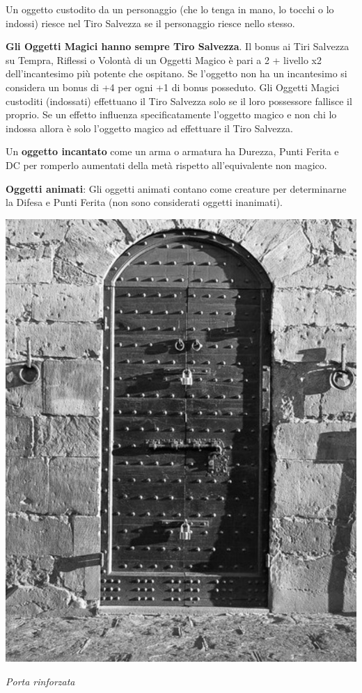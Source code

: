 \begin{multicols}{2}
Un oggetto custodito da un personaggio (che lo tenga in mano, lo tocchi o lo indossi) riesce nel Tiro Salvezza se il personaggio riesce nello stesso.

\textbf{Gli Oggetti Magici hanno sempre Tiro Salvezza}. Il bonus ai Tiri Salvezza su Tempra, Riflessi o Volontà di un Oggetti Magico è pari a 2 + livello x2 dell'incantesimo più potente che ospitano. Se l'oggetto non ha un incantesimo si considera un bonus di +4 per ogni +1 di bonus posseduto. Gli Oggetti Magici custoditi (indossati) effettuano il Tiro Salvezza solo se il loro possessore fallisce il proprio. Se un effetto influenza specificatamente l'oggetto magico e non chi lo indossa allora è solo l'oggetto magico ad effettuare il Tiro Salvezza.

Un \textbf{oggetto incantato} come un arma o armatura ha Durezza, Punti Ferita e DC per romperlo aumentati della metà rispetto all'equivalente non magico.

\textbf{Oggetti animati}: Gli oggetti animati contano come creature per determinarne la Difesa e Punti Ferita (non sono considerati oggetti inanimati).

\medskip

\begin{center}
\includegraphics[width=0.7\linewidth]{immagini/portarinforzata2.png}

\emph{Porta rinforzata}
\end{center}


\end{multicols}
